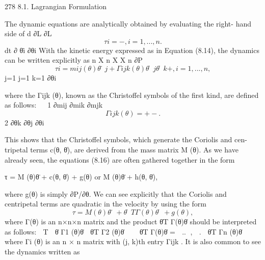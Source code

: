 \documentclass[12pt,a4paper]{article}
\begin{document}
278                                                                     8.1. Lagrangian Formulation

   The dynamic equations are analytically obtained by evaluating the right-
hand side of
                        d ∂L       ∂L
\begin{equation}
τi =           −     ,  i = 1, . . . , n.
\label{eq:8.15}
\end{equation}
                        dt ∂ θ̇i   ∂θi
With the kinetic energy expressed as in Equation (8.14), the dynamics can be
written explicitly as
             n
             X                    n X
                                  X n
                                                                ∂P
\begin{equation}
τi =         mij (θ)θ̈j +             Γijk (θ)θ̇j θ̇k +       ,       i = 1, . . . , n,
\label{eq:8.16}
\end{equation}
             j=1                  j=1 k=1
                                                                ∂θi

where the Γijk (θ), known as the Christoffel symbols of the first kind, are
defined as follows:
                                                     
                                1 ∂mij   ∂mik    ∂mjk
\begin{equation}
Γijk (θ) =        +       −        .
\label{eq:8.17}
\end{equation}
                                2 ∂θk     ∂θj     ∂θi

This shows that the Christoffel symbols, which generate the Coriolis and cen-
tripetal terms c(θ, θ̇), are derived from the mass matrix M (θ).
    As we have already seen, the equations (8.16) are often gathered together in
the form

                τ = M (θ)θ̈ + c(θ, θ̇) + g(θ)            or         M (θ)θ̈ + h(θ, θ̇),

where g(θ) is simply ∂P/∂θ.
    We can see explicitly that the Coriolis and centripetal terms are quadratic
in the velocity by using the form
\begin{equation}
τ = M (θ)θ̈ + θ̇T Γ(θ)θ̇ + g(θ),
\label{eq:8.18}
\end{equation}
where Γ(θ) is an n×n×n matrix and the product θ̇T Γ(θ)θ̇ should be interpreted
as follows:                          T            
                                      θ̇ Γ1 (θ)θ̇
                                     θ̇T Γ2 (θ)θ̇ 
                                                  
                       θ̇T Γ(θ)θ̇ =       ..      ,
                                           .      
                                                     θ̇T Γn (θ)θ̇
where Γi (θ) is an n × n matrix with (j, k)th entry Γijk .
  It is also common to see the dynamics written as
\end{document}
